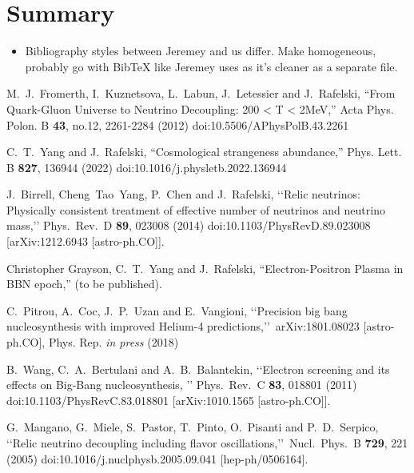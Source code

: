 \documentclass[Universe,article,submit,moreauthors,pdftex]{Definitions/mdpi}
\newcommand*{\xred}{\color{red}}
\begin{document}

\section{Summary}

\begin{itemize}
    \item {\xred Bibliography styles between Jeremey and us differ. Make homogeneous, probably go with BibTeX like Jeremey uses as it's cleaner as a separate file.}
\end{itemize}
\begin{thebibliography}{99}

M.~J.~Fromerth, I.~Kuznetsova, L.~Labun, J.~Letessier and J.~Rafelski,
``From Quark-Gluon Universe to Neutrino Decoupling: 200 < T < 2MeV,''
Acta Phys. Polon. B \textbf{43}, no.12, 2261-2284 (2012)
doi:10.5506/APhysPolB.43.2261

C.~T.~Yang and J.~Rafelski,
``Cosmological strangeness abundance,''
Phys. Lett. B \textbf{827}, 136944 (2022)
doi:10.1016/j.physletb.2022.136944

J.~Birrell, Cheng~Tao~Yang, P.~Chen and J.~Rafelski,
\lq\lq Relic neutrinos: Physically consistent treatment of effective number of neutrinos and neutrino mass,\rq\rq
Phys.\ Rev.\ D {\bf 89}, 023008 (2014)
doi:10.1103/PhysRevD.89.023008
[arXiv:1212.6943 [astro-ph.CO]].

Christopher Grayson, C.~T.~Yang and J.~Rafelski,
``Electron-Positron Plasma in BBN epoch,'' (to be published).

C.~Pitrou, A.~Coc, J.~P.~Uzan and E.~Vangioni,
\lq\lq Precision big bang nucleosynthesis with improved Helium-4 predictions,\rq\rq\ 
arXiv:1801.08023 [astro-ph.CO], Phys. Rep. {\it in press} (2018)


B.~Wang, C.~A.~Bertulani and A.~B.~Balantekin,
\lq\lq Electron screening and its effects on Big-Bang nucleosynthesis, \rq\rq
Phys.\ Rev.\ C {\bf 83}, 018801 (2011)
doi:10.1103/PhysRevC.83.018801
[arXiv:1010.1565 [astro-ph.CO]].

G.~Mangano, G.~Miele, S.~Pastor, T.~Pinto, O.~Pisanti and P.~D.~Serpico,
\lq\lq Relic neutrino decoupling including flavor oscillations,\rq\rq\
Nucl.\ Phys.\ B {\bf 729}, 221 (2005)
doi:10.1016/j.nuclphysb.2005.09.041
[hep-ph/0506164].


\end{thebibliography}
\end{document}
